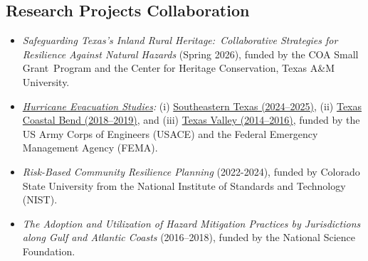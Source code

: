 \documentclass[11pt]{article}
\begin{document}
\subsection*{Research Projects Collaboration}
\vspace{-5pt}
\begin{itemize}[leftmargin=20pt]
\item \emph{Safeguarding Texas's Inland Rural Heritage:~Collaborative Strategies for Resilience Against Natural Hazards} (Spring 2026), funded by the COA Small Grant Program and the Center for Heritage Conservation, Texas A\&M University.
\item \emph{\href{https://texas-planning-atlas-tamu.hub.arcgis.com}{Hurricane Evacuation Studies}:} 
(i) \href{https://texasatlas.arch.tamu.edu}{Southeastern Texas (2024--2025)}, 
(ii) \href{https://texas-planning-atlas-tamu.hub.arcgis.com/apps/337900395c604c3cb2cc1feeb41a9053/explore}{Texas Coastal Bend (2018--2019)}, and 
(iii) \href{https://texas-planning-atlas-tamu.hub.arcgis.com/apps/047af4b2415b442e9bb10108ab1d3eb4/explore}{Texas Valley (2014--2016)}, funded by the {US Army Corps of Engineers (USACE)} and the {Federal Emergency Management Agency (FEMA)}.
\item \emph{Risk-Based Community Resilience Planning} (2022-2024), funded by Colorado State University from the National Institute of Standards and Technology (NIST).
\item \emph{The Adoption and Utilization of Hazard Mitigation Practices by Jurisdictions along Gulf and Atlantic Coasts} (2016--2018), funded by the National Science Foundation.
\end{itemize}
\end{document}
